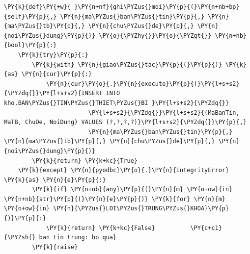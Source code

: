 \begin{Verbatim}[commandchars=\\\{\},frame=single,framerule=0.3pt,rulecolor=\color{black!40},fontsize=\footnotesize,breaklines=true]
\PY{k}{def}\PY{+w}{ }\PY{n+nf}{ghi\PYZus{}moi}\PY{p}{(}\PY{n+nb+bp}{self}\PY{p}{,} \PY{n}{ma\PYZus{}ban\PYZus{}tin}\PY{p}{,} \PY{n}{ma\PYZus{}tb}\PY{p}{,} \PY{n}{chu\PYZus{}de}\PY{p}{,} \PY{n}{noi\PYZus{}dung}\PY{p}{)} \PY{o}{\PYZhy{}}\PY{o}{\PYZgt{}} \PY{n+nb}{bool}\PY{p}{:}
    \PY{k}{try}\PY{p}{:}
        \PY{k}{with} \PY{n}{giao\PYZus{}tac}\PY{p}{(}\PY{p}{)} \PY{k}{as} \PY{n}{cur}\PY{p}{:}
            \PY{n}{cur}\PY{o}{.}\PY{n}{execute}\PY{p}{(}\PY{l+s+s2}{\PYZdq{}}\PY{l+s+s2}{INSERT INTO kho.BAN\PYZus{}TIN\PYZus{}THIET\PYZus{}BI }\PY{l+s+s2}{\PYZdq{}}
                        \PY{l+s+s2}{\PYZdq{}}\PY{l+s+s2}{(MaBanTin, MaTB, ChuDe, NoiDung) VALUES (?,?,?,?)}\PY{l+s+s2}{\PYZdq{}}\PY{p}{,}
                        \PY{n}{ma\PYZus{}ban\PYZus{}tin}\PY{p}{,} \PY{n}{ma\PYZus{}tb}\PY{p}{,} \PY{n}{chu\PYZus{}de}\PY{p}{,} \PY{n}{noi\PYZus{}dung}\PY{p}{)}
        \PY{k}{return} \PY{k+kc}{True}
    \PY{k}{except} \PY{n}{pyodbc}\PY{o}{.}\PY{n}{IntegrityError} \PY{k}{as} \PY{n}{e}\PY{p}{:}
        \PY{k}{if} \PY{n+nb}{any}\PY{p}{(}\PY{n}{m} \PY{o+ow}{in} \PY{n+nb}{str}\PY{p}{(}\PY{n}{e}\PY{p}{)} \PY{k}{for} \PY{n}{m} \PY{o+ow}{in} \PY{n}{\PYZus{}LOI\PYZus{}TRUNG\PYZus{}KHOA}\PY{p}{)}\PY{p}{:}
            \PY{k}{return} \PY{k+kc}{False}          \PY{c+c1}{\PYZsh{} ban tin trung: bo qua}
        \PY{k}{raise}
\end{Verbatim}
